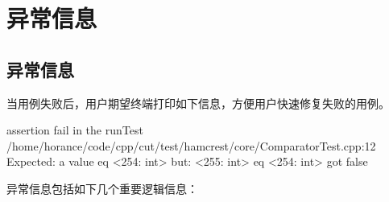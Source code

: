\begin{savequote}[45mm]
\end{savequote}

\chapter{异常信息} 
\label{ch:except-msg}

\begin{content}

\end{content}

\section{异常信息}

\begin{content}

当用例失败后，用户期望终端打印如下信息，方便用户快速修复失败的用例。

\begin{leftbar}
 \begin{c++}
assertion fail in the runTest
/home/horance/code/cpp/cut/test/hamcrest/core/ComparatorTest.cpp:12
Expected: a value eq <254: int>
     but: <255: int> eq <254: int> got false
 \end{c++}
\end{leftbar}

异常信息包括如下几个重要逻辑信息：

\begin{enum}
    \begin{enum}
    \end{enum}
    \begin{enum}
    \end{enum}
    \begin{enum}
    \end{enum}
\end{enum}

\end{content}

